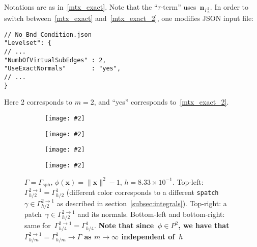 \documentclass[12pt]{article}
\newcommand{\includegraphicsw}[2][1.]{\texttt{[image: \#2]}}
\newcommand{\vect}[1]{\boldsymbol{\mathbf{#1}}}
\newcommand{\sphere}{{\Gamma_{\text{sph}}}}
\begin{document}
Notations are as in~\eqref{mtx_exact}. Note that the ``$\tau$-term'' uses~$\vect n_{\Gamma_h^2}$. In order to switch between~\eqref{mtx_exact} and~\eqref{mtx_exact_2}, one modifies JSON input file: 
\begin{lstlisting}
// No_Bnd_Condition.json
"Levelset": {
// ...
"NumbOfVirtualSubEdges" : 2,
"UseExactNormals"       : "yes",
// ...
}
\end{lstlisting}
Here 2 corresponds to $m = 2$, and ``yes'' corresponds to~\eqref{mtx_exact_2}.

\clearpage
\begin{figure}[h!]
	\par\bigskip
	\centering
	\begin{subfigure}{.5\linewidth}
		\centering
		\includegraphicsw[.6]{patches_2.png}
	\end{subfigure}%
	\begin{subfigure}{.5\linewidth}
		\centering
		\includegraphicsw[.6]{normals_2.png}
	\end{subfigure}%
	\par\bigskip
	\begin{subfigure}{.5\linewidth}
		\centering
		\includegraphicsw[.6]{patches_4.png}
	\end{subfigure}%
	\begin{subfigure}{.5\linewidth}
		\centering
		\includegraphicsw[.6]{normals_4.png}
	\end{subfigure}%
	\par\bigskip
	\caption{$\Gamma = \sphere$, $\phi(\vect x) = \|\vect x\|^2 - 1$, $h = 8.33\times10^{-1}$. Top-left: $\Gamma_{h/2}^{2 \rightarrow 1} = \Gamma_{h/2}^1$ (different color corresponds to a different \texttt{spatch} $\gamma \in \Gamma_{h/2}^{2 \rightarrow 1}$ as described in section~\ref{subsec:integrals}). Top-right: a patch~$\gamma \in \Gamma_{h/2}^{2 \rightarrow 1}$ and its normals. Bottom-left and bottom-right: same for~$\Gamma_{h/4}^{2 \rightarrow 1} = \Gamma_{h/4}^1$. \textbf{Note that since~$\phi \in P^2$, we have that~$\Gamma_{h/m}^{2 \rightarrow 1} = \Gamma_{h/m}^1 \rightarrow \Gamma$ as $m \rightarrow \infty$ independent of~$h$}}
	\label{fig:phi_exact}		
\end{figure}
\vfill
\end{document}
